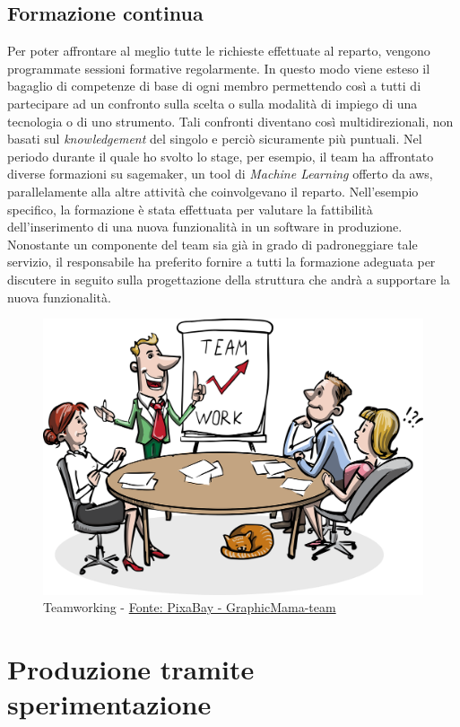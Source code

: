 \subsection{Formazione continua}
Per poter affrontare al meglio tutte le richieste effettuate al reparto, vengono programmate sessioni formative regolarmente. In questo modo viene esteso il bagaglio di competenze di base di ogni membro permettendo così a tutti di partecipare ad un confronto sulla scelta o sulla modalità di impiego di una tecnologia o di uno strumento. Tali confronti diventano così multidirezionali, non basati sul \textit{knowledgement} del singolo e perciò sicuramente più puntuali. Nel periodo durante il quale ho svolto lo stage, per esempio, il team ha affrontato diverse formazioni su \gls{sagemaker}\glsfirstoccur, un tool di \textit{Machine Learning} offerto da \acrlong{aws}\glsfirstoccur, parallelamente alla altre attività che coinvolgevano il reparto. Nell'esempio specifico, la formazione è stata effettuata per valutare la fattibilità dell'inserimento di una nuova funzionalità in un software in produzione. Nonostante un componente del team sia già in grado di padroneggiare tale servizio, il responsabile ha preferito fornire a tutti la formazione adeguata per discutere in seguito sulla progettazione della struttura che andrà a supportare la nuova funzionalità.

\begin{figure}[H] 
    \centering 
    \includegraphics[width=0.5\columnwidth]{immagini/team_working.png} 
    \caption{Teamworking - \href{https://pixabay.com/it/users/GraphicMama-team-2641041/?utm_source=link-attribution&amp;utm_medium=referral&amp;utm_campaign=image&amp;utm_content=1453895}{Fonte: PixaBay - GraphicMama-team}}
\end{figure}
\section{Produzione tramite sperimentazione}
